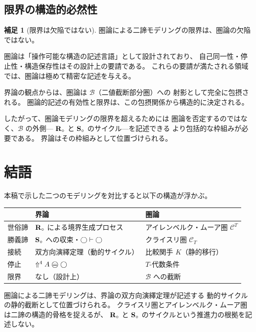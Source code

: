 \documentclass[11pt,a4paper]{ltjsarticle}
\theoremstyle{definition}
\newtheorem{scholium}{補足}[section]
\begin{document}
\subsection{限界の構造的必然性}

\begin{scholium}[限界は欠陥ではない]
圏論による二諦モデリングの限界は、圏論の欠陥ではない。

圏論は「操作可能な構造の記述言語」として設計されており、
自己同一性・停止性・構造保存性はその設計上の要請である。
これらの要請が満たされる領域では、圏論は極めて精密な記述を与える。

界論の観点からは、圏論は $\mathcal{B}$（二値截断部分圏）への
射影として完全に包摂される。
圏論的記述の有効性と限界は、この包摂関係から構造的に決定される。

したがって、圏論モデリングの限界を超えるためには
圏論を否定するのではなく、$\mathcal{B}$ の外側---
$\mathbf{R}_{\circ}$ と $\mathbf{S}_{\circ}$ のサイクル---を記述できる
より包括的な枠組みが必要である。
界論はその枠組みとして位置づけられる。
\end{scholium}

\section{結語}

本稿で示した二つのモデリングを対比すると以下の構造が浮かぶ。

\begin{center}
\begin{tabular}{lll}
\hline
 & \textbf{界論} & \textbf{圏論} \\
\hline
世俗諦 & $\mathbf{R}_{\circ}$ による境界生成プロセス & アイレンベルク・ムーア圏 $\mathcal{C}^T$ \\
勝義諦 & $\mathbf{S}_{\circ}$ への収束・$\bigcirc \vdash \bigcirc$ & クライスリ圏 $\mathcal{C}_T$ \\
接続 & 双方向演繹定理（動的サイクル） & 比較関手 $K$（静的移行） \\
停止 & $\metanegation^4 A \mweq \dfix$ & $T$-代数条件 \\
限界 & なし（設計上） & $\mathcal{B}$ への截断 \\
\hline
\end{tabular}
\end{center}

圏論による二諦モデリングは、界論の双方向演繹定理が記述する
動的サイクルの静的截断として位置づけられる。
クライスリ圏とアイレンベルク・ムーア圏は二諦の構造的骨格を捉えるが、
$\mathbf{R}_{\circ}$ と $\mathbf{S}_{\circ}$ のサイクルという推進力の根拠を記述しない。
\end{document}
